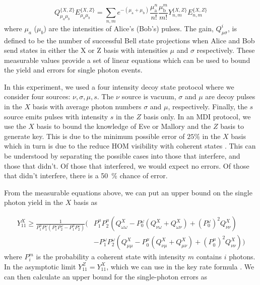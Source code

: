 \begin{equation}
	Q^{\{X, Z\}}_{\mu_{a} \mu_{b}} E^{\{X, Z\}}_{\mu_{a} \mu_{b}}=\sum_{n, m} e^{-\left(\mu_{\mathrm{a}}+\mu_{\mathrm{b}}\right)} \frac{\mu_{\mathrm{a}}^{n}}{n !} \frac{\mu_{\mathrm{b}}^{m}}{m !} Y^{\{X, Z\}}_{n, m} E^{\{X, Z\}}_{n, m}
\end{equation}
where $\mu_a$ ($\mu_b$) are the intensities of Alice's (Bob's) pulses. The gain, $Q_{\mu\sigma}^i$, is defined to be the number of successful Bell state projections when Alice and Bob send states in either the X or Z basis with intensities $\mu$ and $\sigma$ respectively. These measurable values provide a set of linear equations which can be used to bound the yield and errors for single photon events.

In this experiment, we used a four intensity decoy state protocol \cite{zhou2016} where we consider four sources: $\nu, \sigma, \mu, s$. The $\nu$ source is vacuum, $\sigma$ and $\mu$ are decoy pulses in the $X$ basis with average photon numbers $\sigma$ and $\mu$, respectively. Finally, the $s$ source emits pulses with intensity $s$ in the $Z$ basis only. In an \ac{MDI} protocol, we use the $X$ basis to bound the knowledge of Eve or Mallory and the $Z$ basis to generate key. This is due to the minimum possible error of $25\%$ in the $X$ basis \cite{Rubenok2013} which in turn is due to the reduce \ac{HOM} visibility with coherent states \cite{Rarity2005}. This can be understood by separating the possible cases into those that interfere, and those that didn't. Of those that interfered, we would expect no errors. Of those that didn't interfere, there is a \SI{50}{\percent} chance of error. 

From the measurable equations above, we can put an upper bound on the single photon yield in the $X$ basis as

\begin{equation}
	\begin{split}
	Y^X_{11} \ge \frac{1}{P^\mu_1 P^\omega_1 ( P^\omega_1  P^\omega_2 - P^\mu_1 P^\omega_2)} \Big(&P^\mu_1 P^\mu_2 (Q_{\omega\omega}^{X} - P^\omega_0 ( Q_{\nu\omega}^X + Q_{\omega\nu}^X) + (P^\omega_0)^2 Q_{\nu\nu}^X) \\
	&- P^\omega_1 P^\omega_2(Q_{\mu\mu}^{X} - P^\mu_0 ( Q_{\nu\mu}^X + Q_{\mu\nu}^X) + (P^\mu_0)^2 Q_{\nu\nu}^X)\Big)
	\end{split}
\end{equation}
where $P_i^m$ is the probability a coherent state with intensity $m$ contains $i$ photons. In the asymptotic limit $Y^Z_{11} =  Y^X_{11}$, which we can use in the key rate formula \cite{Wang2019asymmetric}. We can then calculate an upper bound for the single-photon errors as 

